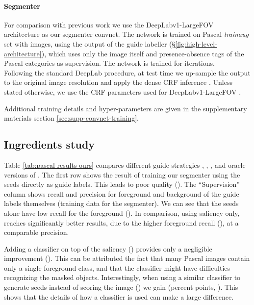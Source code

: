\documentclass[british,10pt,twocolumn,letterpaper]{article}
\begin{document}
\paragraph{Segmenter}

For comparison with previous work we use the DeepLabv1-LargeFOV \cite{Chen2016ArxivDeeplabv2}
architecture as our segmenter convnet. The network is trained on Pascal
\textit{trainaug} set with  images, using the output of the guide
labeller (\S\ref{fig:high-level-architecture}), which uses only
the image itself and presence-absence tags of the  Pascal categories
as supervision. The network is trained for  iterations. \\
Following the standard DeepLab procedure, at test time we up-sample
the output to the original image resolution and apply the dense CRF
inference \cite{Kraehenbuehl2011Nips}. Unless stated otherwise, we
use the CRF parameters used for DeepLabv1-LargeFOV \cite{Chen2016ArxivDeeplabv2}.

Additional training details and hyper-parameters are given in the
supplementary materials section \ref{sec:supp-convnet-training}.


\subsection{\label{subsec:Ingredients-study}Ingredients study}

 \noindent Table \ref{tab:pascal-results-ours} compares different
 guide strategies , , ,
 and oracle versions of . The first row shows the
 result of training our segmenter using the seeds directly as guide
 labels. This leads to poor quality (). The ``Supervision''
column shows recall and precision for foreground and background of
the guide labels themselves (training data for the segmenter). We
can see that the seeds alone have low recall for the foreground ().
In comparison, using saliency only,  reaches significantly
better results, due to the higher foreground recall (), at
a comparable precision.

Adding a classifier on top of the saliency ()
provides only a negligible improvement (). This
can be attributed the fact that many Pascal images contain only a
single foreground class, and that the classifier might have difficulties
recognizing the masked objects. Interestingly, when using a similar
classifier to generate seeds instead of scoring the image ()
we gain  (percent points, ).
This shows that the details of how a classifier is used can make a
large difference. 
\end{document}
